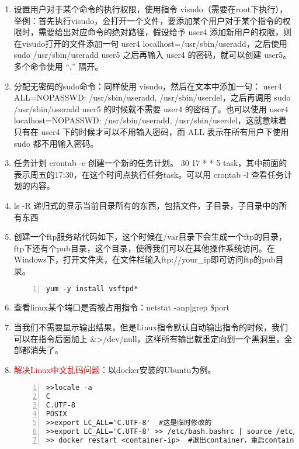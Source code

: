 \begin{enumerate}
  \item 设置用户对于某个命令的执行权限，使用指令 visudo（需要在root下执行），举例：首先执行visudo，会打开一个文件，要添加某个用户对于某个指令的权限时，需要给出对应命令的绝对路径，假设给予 user4 添加新用户的权限，则在visudo打开的文件添加一句 user4 localhost=/usr/sbin/useradd，之后使用 sudo /usr/sbin/useradd user5 之后再输入 user4 的密码，就可以创建 user5。多个命令使用 “,” 隔开。
  \item 分配无密码的sudo命令：同样使用 visudo，然后在文本中添加一句： user4 ALL=NOPASSWD: /usr/sbin/useradd, /usr/sbin/userdel，之后再调用 sudo /usr/sbin/useradd user5 的时候就不需要 user4 的密码了。也可以使用 user4 localhost=NOPASSWD: /usr/sbin/useradd, /usr/sbin/userdel，这就意味着只有在 user4 下的时候才可以不用输入密码，而 ALL 表示在所有用户下使用 sudo 都不用输入密码。
  \item 任务计划  crontab -e 创建一个新的任务计划。 30 17 * * 5 task，其中前面的表示周五的17:30，在这个时间点执行任务task。可以用 crontab -l 查看任务计划的内容。
  \item ls -R 递归式的显示当前目录所有的东西，包括文件，子目录，子目录中的所有东西
  \item 创建一个ftp服务站代码如下，这个时候在/var目录下会生成一个ftp的目录，ftp下还有个pub目录，这个目录，使得我们可以在其他操作系统访问。在Windows下，打开文件夹，在文件栏输入ftp://your\_ip即可访问ftp的pub目录。
  \begin{lstlisting}[language = shell, numbers=left, 
         numberstyle=\tiny,keywordstyle=\color{blue!70},
         commentstyle=\color{red!50!green!50!blue!50},frame=shadowbox,
         rulesepcolor=\color{red!20!green!20!blue!20},basicstyle=\ttfamily]
yum -y install vsftpd*
  \end{lstlisting}
  \item 查看linux某个端口是否被占用指令：netstat -anp|grep \$port
  \item 当我们不需要显示输出结果，但是Linux指令默认自动输出指令的时候，我们可以在指令后面加上 \&>/dev/null，这样所有输出就重定向到一个黑洞里，全部都消失了。
  \item \textcolor{red}{解决Linux中文乱码问题}：以docker安装的Ubuntu为例。
   \begin{lstlisting}[language = shell, numbers=left, 
         numberstyle=\tiny,keywordstyle=\color{blue!70},
         commentstyle=\color{red!50!green!50!blue!50},frame=shadowbox,
         rulesepcolor=\color{red!20!green!20!blue!20},basicstyle=\ttfamily]
>>locale -a
C
C.UTF-8
POSIX
>>export LC_ALL='C.UTF-8'  #这是临时修改的
>>export LC_ALL='C.UTF-8' >> /etc/bash.bashrc | source /etc/bash.bashrc  #这是永久修改。
>> docker restart <container-ip>  #退出container，重启container即可
  \end{lstlisting} 
\end{enumerate}

